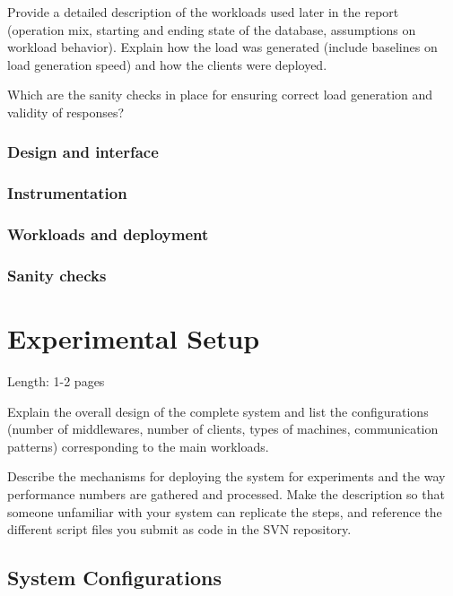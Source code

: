 \documentclass[11pt]{article}
\begin{document}
Provide a detailed description of the workloads used later in the report
(operation mix, starting and ending state of the database, assumptions
on workload behavior). Explain how the load was generated (include
baselines on load generation speed) and how the clients were deployed.

Which are the sanity checks in place for ensuring correct load
generation and validity of responses?

\subsubsection{Design and interface}\label{sec:design-and-interface}

\subsubsection{Instrumentation}\label{sec:instrumentation}

\subsubsection{Workloads and deployment}\label{sec:workloads-and-deployment}

\subsubsection{Sanity checks}\label{sec:sanity-checks}

\section{Experimental Setup}\label{sec:experimental-setup}

Length: 1-2 pages

Explain the overall design of the complete system and list the
configurations (number of middlewares, number of clients, types of
machines, communication patterns) corresponding to the main workloads.

Describe the mechanisms for deploying the system for experiments and the
way performance numbers are gathered and processed. Make the description
so that someone unfamiliar with your system can replicate the steps, and
reference the different script files you submit as code in the SVN
repository.

\subsection{System Configurations}\label{sec:system-configurations}
\end{document}
